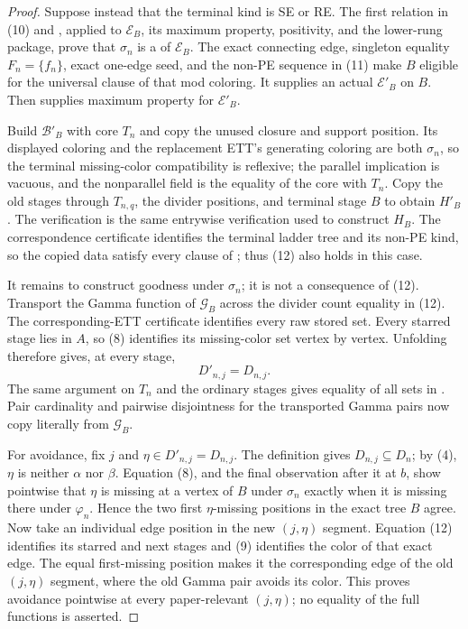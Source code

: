 \begin{proof}
Suppose instead that the terminal kind is SE or RE.  The first relation
in (10) and , applied to $\mathcal E_B$, its maximum
property, positivity, and the lower-rung package, prove that $\sigma_n$
is a  of $\mathcal E_B$.  The exact connecting edge,
singleton equality $F_n=\{f_n\}$, exact one-edge seed, and the non-PE
sequence in (11) make $B$ eligible for the universal clause of that mod
coloring.  It supplies an actual
 $\mathcal E'_B$ on $B$.
Then  supplies maximum property for
$\mathcal E'_B$.

Build $\mathcal B'_B$ with core $T_n$ and copy the unused closure and
support position.  Its displayed coloring and the replacement ETT's
generating coloring are both $\sigma_n$, so the terminal missing-color
compatibility is reflexive; the parallel implication is vacuous, and the
nonparallel field is the equality of the core with $T_n$.  Copy the
old stages through $T_{n,q}$, the divider positions, and terminal stage
$B$ to obtain $H'_B$.  The verification is the same entrywise verification
used to construct $H_B$.  The correspondence certificate identifies the
terminal ladder tree and its non-PE kind, so the copied data satisfy every
clause of ; thus (12) also holds in this
case.

It remains to construct goodness under $\sigma_n$; it is not a consequence
of (12).  Transport the Gamma function of $\mathcal G_B$ across the divider
count equality in (12).  The corresponding-ETT certificate identifies
every raw stored set.  Every starred stage lies in $A$, so (8) identifies
its missing-color set vertex by vertex.  Unfolding
 therefore gives, at every stage,
\[
                         D'_{n,j}=D_{n,j}.                      \tag{13}
\]
The same argument on $T_n$ and the ordinary stages gives equality of all
sets in .  Pair cardinality and
pairwise disjointness for the transported Gamma pairs now copy literally
from $\mathcal G_B$.

For avoidance, fix $j$ and $\eta\in D'_{n,j}=D_{n,j}$.  The definition
 gives $D_{n,j}\subseteq D_n$; by (4),
$\eta$ is neither $\alpha$ nor $\beta$.  Equation (8), and the final
observation after it at $b$, show pointwise that $\eta$ is missing at a
vertex of $B$ under $\sigma_n$ exactly when it is missing there under
$\varphi_n$.  Hence the two first $\eta$-missing positions in the exact
tree $B$ agree.  Now take an individual edge position in the new
$(j,\eta)$ segment.  Equation (12) identifies its starred and next stages
and (9) identifies the color of that exact edge.  The equal first-missing
position makes it the corresponding edge of the old $(j,\eta)$ segment,
where the old Gamma pair avoids its color.  This proves avoidance
pointwise at every paper-relevant $(j,\eta)$; no equality of the full
 functions is asserted.


\end{proof}
